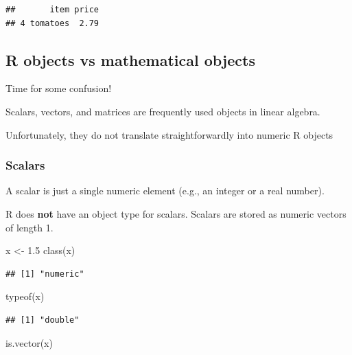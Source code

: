 \documentclass[
  11pt,
]{article}
\newenvironment{Shaded}{\begin{snugshade}}{\end{snugshade}}
\newcommand{\FloatTok}[1]{\textcolor[rgb]{0.00,0.00,0.81}{#1}}
\newcommand{\FunctionTok}[1]{\textcolor[rgb]{0.00,0.00,0.00}{#1}}
\newcommand{\NormalTok}[1]{#1}
\newcommand{\OtherTok}[1]{\textcolor[rgb]{0.56,0.35,0.01}{#1}}
\begin{document}
\begin{verbatim}
##       item price
## 4 tomatoes  2.79
\end{verbatim}

\hypertarget{r-objects-vs-mathematical-objects}{%
\subsection{R objects vs mathematical objects}\label{r-objects-vs-mathematical-objects}}

Time for some confusion!

Scalars, vectors, and matrices are frequently used objects in linear algebra.

Unfortunately, they do not translate straightforwardly into numeric R objects

\hypertarget{scalars}{%
\subsubsection{Scalars}\label{scalars}}

A scalar is just a single numeric element (e.g., an integer or a real number).

R does \textbf{not} have an object type for scalars. Scalars are stored as numeric vectors of length 1.

\begin{Shaded}
\begin{Highlighting}[]
\NormalTok{x }\OtherTok{\textless{}{-}} \FloatTok{1.5}
\FunctionTok{class}\NormalTok{(x)}
\end{Highlighting}
\end{Shaded}

\begin{verbatim}
## [1] "numeric"
\end{verbatim}

\begin{Shaded}
\begin{Highlighting}[]
\FunctionTok{typeof}\NormalTok{(x)}
\end{Highlighting}
\end{Shaded}

\begin{verbatim}
## [1] "double"
\end{verbatim}

\begin{Shaded}
\begin{Highlighting}[]
\FunctionTok{is.vector}\NormalTok{(x)}
\end{Highlighting}
\end{Shaded}
\end{document}
